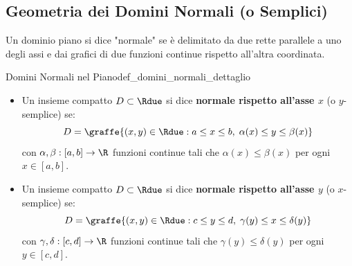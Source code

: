 \subsection{Geometria dei Domini Normali (o Semplici)}

Un dominio piano si dice "normale" se è delimitato da due rette parallele a uno degli assi e dai grafici di due funzioni continue rispetto all'altra coordinata.

\begin{definizione}{Domini Normali nel Piano}{def_domini_normali_dettaglio}
\begin{itemize}
    \item Un insieme compatto $D \subset \Rdue$ si dice \textbf{normale rispetto all'asse $x$} (o $y$-semplice) se:
    \[
    D = \graffe{(x,y) \in \Rdue : a \le x \le b, \; \alpha(x) \le y \le \beta(x)}
    \]
    con $\alpha, \beta: [a,b] \to \R$ funzioni continue tali che $\alpha(x) \le \beta(x)$ per ogni $x \in [a,b]$.
    \item Un insieme compatto $D \subset \Rdue$ si dice \textbf{normale rispetto all'asse $y$} (o $x$-semplice) se:
    \[
    D = \graffe{(x,y) \in \Rdue : c \le y \le d, \; \gamma(y) \le x \le \delta(y)}
    \]
    con $\gamma, \delta: [c,d] \to \R$ funzioni continue tali che $\gamma(y) \le \delta(y)$ per ogni $y \in [c,d]$.
\end{itemize}
\end{definizione}

